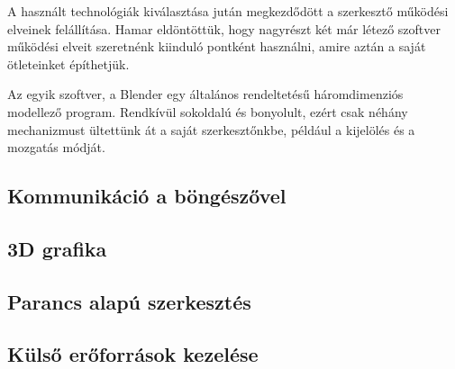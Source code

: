 A használt technológiák kiválasztása jután megkezdődött a szerkesztő működési elveinek felállítása.
Hamar eldöntöttük, hogy nagyrészt két már létező szoftver működési elveit szeretnénk kiinduló
pontként használni, amire aztán a saját ötleteinket építhetjük.

Az egyik szoftver, a Blender egy általános rendeltetésű háromdimenziós modellező program.
Rendkívül sokoldalú és bonyolult, ezért csak néhány mechanizmust ültettünk át a saját
szerkesztőnkbe, például a kijelölés és a mozgatás módját.


\subsection{Kommunikáció a böngészővel}
\subsection{3D grafika}
\subsection{Parancs alapú szerkesztés}
\subsection{Külső erőforrások kezelése}
